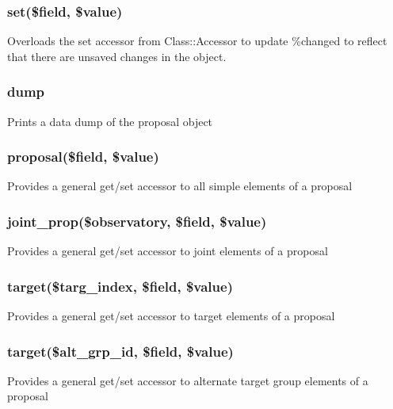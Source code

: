 \documentclass{article}
\begin{document}
\subsubsection*{set(\$field, \$value)\label{Proposal_set_field_value_}}


Overloads the set accessor from Class::Accessor to update \%changed to
reflect that there are unsaved changes in the object.

\subsubsection*{dump\label{Proposal_dump}}


Prints a data dump of the proposal object

\subsubsection*{proposal(\$field, \$value)\label{Proposal_proposal_field_value_}}


Provides a general get/set accessor to all simple elements of a
proposal

\subsubsection*{joint\_prop(\$observatory, \$field, \$value)\label{Proposal_joint_prop_observatory_field_value_}}


Provides a general get/set accessor to joint elements of a proposal

\subsubsection*{target(\$targ\_index, \$field, \$value)\label{Proposal_target_targ_index_field_value_}}


Provides a general get/set accessor to target elements of a proposal

\subsubsection*{target(\$alt\_grp\_id, \$field, \$value)\label{Proposal_target_alt_grp_id_field_value_}}


Provides a general get/set accessor to alternate target group elements of 
a proposal
\end{document}
